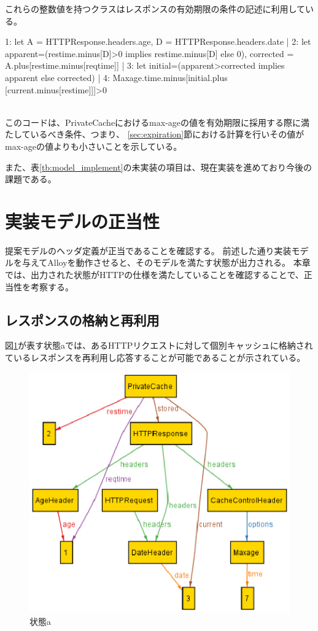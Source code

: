 \documentclass{css}
\begin{document}
これらの整数値を持つクラスはレスポンスの有効期限の条件の記述に利用している。\\\hrulefill
\begin{small}
\begin{verbatimtab}[3]
1:	let A = HTTPResponse.headers.age, 
	D = HTTPResponse.headers.date |
2:		let apparent=(restime.minus[D]>0 implies
		restime.minus[D] else 0), corrected = 
		A.plus[restime.minus[reqtime]] | 
3:			let initial=(apparent>corrected 
			implies apparent else corrected) | 
4:				Maxage.time.minus[initial.plus
				[current.minus[restime]]]>0
\end{verbatimtab}
\end{small}
\hrulefill\\
このコードは、PrivateCacheにおけるmax-ageの値を有効期限に採用する際に満たしているべき条件、つまり、
\ref{sec:expiration}節における計算を行いその値がmax-ageの値よりも小さいことを示している。

また、表\ref{tb:model_implement}の未実装の項目は、現在実装を進めており今後の課題である。
\color{black}

\section{実装モデルの正当性}
提案モデルのヘッダ定義が正当であることを確認する。
前述した通り実装モデルを与えてAlloyを動作させると、そのモデルを満たす状態が出力される。
本章では、出力された状態がHTTPの仕様を満たしていることを確認することで、正当性を考察する。

\subsection{レスポンスの格納と再利用}
図\ref{fig:case1}が表す状態aでは、あるHTTPリクエストに対して個別キャッシュに格納されているレスポンスを再利用し応答することが可能であることが示されている。

\begin{figure}[htb]
\centering
\includegraphics[width=1.0\hsize]{case1.eps}
\caption{状態a}
\label{fig:case1}
\end{figure}
\end{document}
